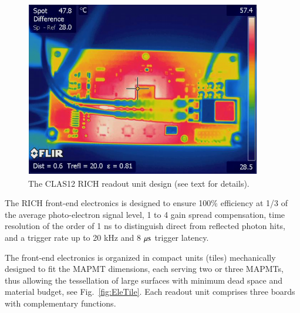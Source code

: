\documentclass[final,5p,times,twocolumn]{elsarticle}
\begin{document}
\begin{figure}[t]
\begin{center}
\includegraphics[width=0.70\columnwidth]{EPS/FPGA_heat.pdf}
\end{center}
\caption{The CLAS12 RICH readout unit design (see text for details).}
\label{Fig:EleTile}
\end{figure}

The RICH front-end electronics is designed to ensure 100\% efficiency at 1/3 of the average photo-electron signal level, 1 to 4 
gain spread compensation, time resolution of the order of 1 ns to distinguish direct from reflected photon hits, 
and a trigger rate up to 20 kHz and 8 $\rm \mu s$ trigger latency. 

The front-end electronics is organized in compact units (tiles) mechanically designed to fit the MAPMT dimensions,
each serving two or three MAPMTs, thus allowing the tessellation of large surfaces with minimum dead space 
and material budget, see Fig.~\ref{fig:EleTile}. Each readout unit comprises three boards with complementary 
functions.
\end{document}
